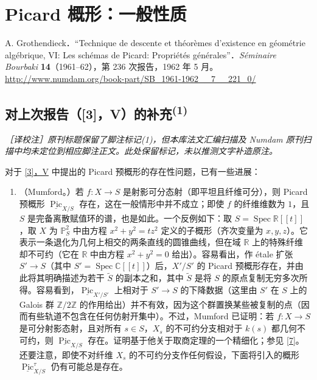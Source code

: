 \part{Picard 概形：一般性质}\label{fga3.vi}\thispagestyle{fancy}\begin{original}{}\label{fga3.vi-original-citation}\skipsinglepar\par{}A. Grothendieck．“Technique de descente et théorèmes d'existence en géométrie algébrique, VI: Les schémas de Picard: Propriétés générales”．\emph{Séminaire Bourbaki} \textbf{14}（1961–62），第 236 次报告，1962 年 5 月。\url{http://www.numdam.org/book-part/SB_1961-1962__7__221_0/}\end{original}\setcounter{chapter}{-1}\chapter[{对上次报告（[3]，V）的补充}]{对上次报告（[3]，V）的补充\textsuperscript{(1)}}\thispagestyle{fancy}\label{fga3.vi-0}\par{}\emph{［译校注］原刊标题保留了脚注标记(1)，但本库法文汇编扫描及 Numdam 原刊扫描中均未定位到相应脚注正文。此处保留标记，未以推测文字补造原注。}\par{}对于 \hyperref[fga3.v]{[3]，V} 中提出的 Picard 预概形的存在性问题，已有一些进展：\begin{enumerate}
    
 \item[a.]（Mumford。）若 \(f\colon  X\to  S\) 是射影可分态射（即平坦且纤维可分），则 Picard 预概形 \(\underline {\operatorname {Pic}}_{X/S}\) 存在，这在一般情形中并不成立；即使 \(f\) 的纤维维数为 \(1\)，且 \(S\) 是完备离散赋值环的谱，也是如此。一个反例如下：取 \(S=\operatorname {Spec}\mathbb {R}[{[t]}]\)，取 \(X\) 为 \(\mathbb {P}_S^2\) 中由方程 \(x^2+y^2=tz^2\) 定义的子概形（齐次变量为 \(x,y,z\)）。它表示一条退化为几何上相交的两条直线的圆锥曲线，但在域 \(\mathbb {R}\) 上的特殊纤维却不可约（它在 \(\mathbb {R}\) 中由方程 \(x^2+y^2=0\) 给出）。容易看出，作 étale 扩张 \(S'\to  S\)（其中 \(S'=\operatorname {Spec}\mathbb {C}[{[t]}]\)）后，\(X'/S'\) 的 Picard 预概形存在，并由此将其明确描述为若干 \(\widetilde {S}\) 的副本之和，其中 \(\widetilde {S}\) 是将 \(S\) 的原点复制无穷多次所得。容易看到，\(\underline {\operatorname {Pic}}_{X'/S'}\) 上相对于 \(S'\to  S\) 的下降数据（这里由 \(S'\) 在 \(S\) 上的 Galois 群 \(\mathbb {Z}/2\mathbb {Z}\) 的作用给出）并不有效，因为这个群置换某些被复制的点（因而有些轨道不包含在任何仿射开集中）。不过，Mumford 已证明：若 \(f\colon  X\to  S\) 是可分射影态射，且对所有 \(s\in  S\)，\(X_s\) 的不可约分支相对于 \(k(s)\) 都几何不可约，则 \(\underline {\operatorname {Pic}}_{X/S}\) 存在。证明基于他关于取商定理的一个精细化；参见 \hyperref[fga3.vi-bib-7]{[7]}。还要注意，即使不对纤维 \(X_s\) 的不可约分支作任何假设，下面将引入的概形 \(\underline {\operatorname {Pic}}_{X/S}^\tau \) 仍有可能总是存在。



\end{enumerate}
